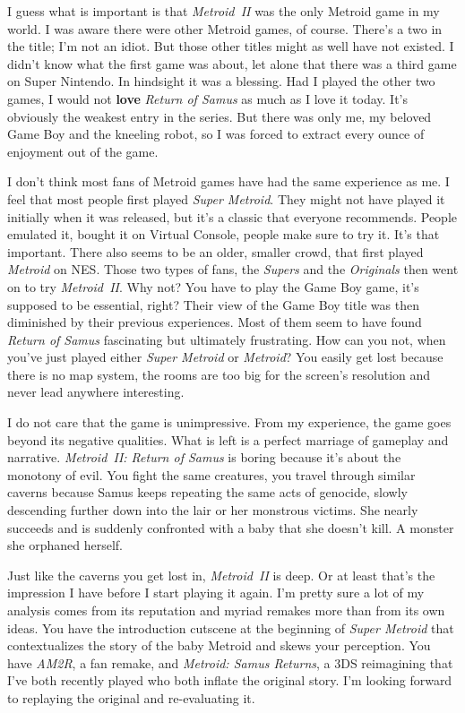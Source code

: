 \documentclass{book}
\begin{document}
I guess what is important is that \emph{Metroid II} was the only Metroid game in my world. I was aware there were other Metroid games, of course. There’s a two in the title; I’m not an idiot. But those other titles might as well have not existed. I didn’t know what the first game was about, let alone that there was a third game on Super Nintendo. In hindsight it was a blessing. Had I played the other two games, I would not \textbf{love} \emph{Return of Samus} as much as I love it today. It’s obviously the weakest entry in the series. But there was only me, my beloved Game Boy and the kneeling robot, so I was forced to extract every ounce of enjoyment out of the game.

I don’t think most fans of Metroid games have had the same experience as me. I feel that most people first played \emph{Super Metroid}. They might not have played it initially when it was released, but it’s a classic that everyone recommends. People emulated it, bought it on Virtual Console, people make sure to try it. It’s that important. There also seems to be an older, smaller crowd, that first played \emph{Metroid} on NES. Those two types of fans, the \emph{Supers} and the \emph{Originals} then went on to try \emph{Metroid II}. Why not? You have to play the Game Boy game, it’s supposed to be essential, right? Their view of the Game Boy title was then diminished by their previous experiences. Most of them seem to have found \emph{Return of Samus} fascinating but ultimately frustrating. How can you not, when you’ve just played either \emph{Super Metroid} or \emph{Metroid}? You easily get lost because there is no map system, the rooms are too big for the screen’s resolution and never lead anywhere interesting.

I do not care that the game is unimpressive. From my experience, the game goes beyond its negative qualities. What is left is a perfect marriage of gameplay and narrative. \emph{Metroid II: Return of Samus} is boring because it’s about the monotony of evil. You fight the same creatures, you travel through similar caverns because Samus keeps repeating the same acts of genocide, slowly descending further down into the lair or her monstrous victims. She nearly succeeds and is suddenly confronted with a baby that she doesn’t kill. A monster she orphaned herself.

Just like the caverns you get lost in, \emph{Metroid II} is deep. Or at least that’s the impression I have before I start playing it again. I’m pretty sure a lot of my analysis comes from its reputation and myriad remakes more than from its own ideas. You have the introduction cutscene at the beginning of \emph{Super Metroid} that contextualizes the story of the baby Metroid and skews your perception. You have \emph{AM2R}, a fan remake, and \emph{Metroid: Samus Returns}, a 3DS reimagining that I’ve both recently played who both inflate the original story. I’m looking forward to replaying the original and re-evaluating it.
\end{document}
